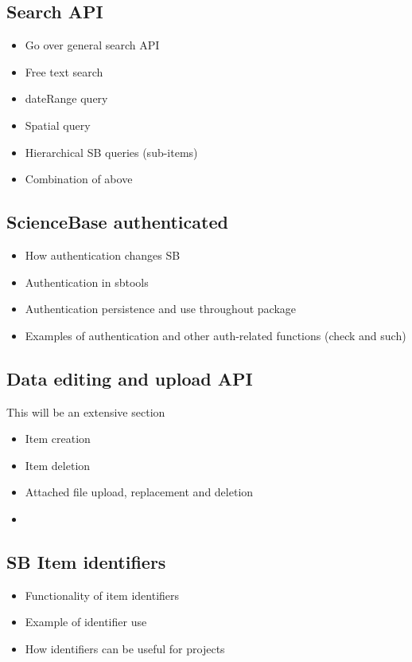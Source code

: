 
\subsection{Search API}
\begin{itemize}
	\item{Go over general search API}
	\item{Free text search}
	\item{dateRange query}
	\item{Spatial query}
	\item{Hierarchical SB queries (sub-items)}
	\item{Combination of above}
\end{itemize}

\subsection{ScienceBase authenticated}

\begin{itemize}
	\item{How authentication changes SB}
	\item{Authentication in sbtools}
	\item{Authentication persistence and use throughout package}
	\item{Examples of authentication and other auth-related functions (check and such)}
\end{itemize}


\subsection{Data editing and upload API}
This will be an extensive section
\begin{itemize}
	\item{Item creation}
	\item{Item deletion}
	\item{Attached file upload, replacement and deletion}
	\item{}
\end{itemize}

\subsection{SB Item identifiers}
\begin{itemize}
	\item{Functionality of item identifiers}
	\item{Example of identifier use}
	\item{How identifiers can be useful for projects}
\end{itemize}
